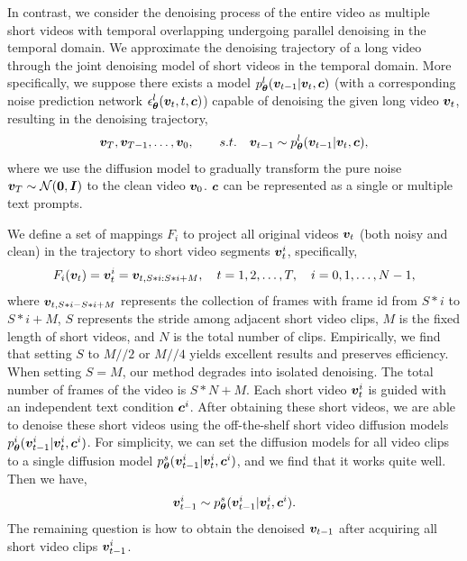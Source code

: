 \documentclass{article}
\begin{document}
In contrast, we consider the denoising process of the entire video as multiple short videos with temporal overlapping undergoing parallel denoising in the temporal domain. We approximate the denoising trajectory of a long video through the joint denoising model of short videos in the temporal domain. More specifically, we suppose there exists a model $p^l_{\bm{\theta}}({\bm{v}}_{t-1}|{\bm{v}}_{t},{\bm{c}})$ (with a corresponding noise prediction network $\epsilon_{{\bm{\theta}}}^l({\bm{v}}_t,t,{\bm{c}})$) capable of denoising the given long video ${\bm{v}}_t$, resulting in the denoising trajectory,
\begin{align*}
 {\bm{v}}_{T},{\bm{v}}_{T-1},\dots,{\bm{v}}_0, \qquad s.t. \quad {\bm{v}}_{t-1} \sim p^l_{\bm{\theta}}({\bm{v}}_{t-1}|{\bm{v}}_{t},{\bm{c}}),
\end{align*}
where we use the diffusion model to gradually transform the pure noise ${\bm{v}}_T\sim \mathcal N(\boldsymbol{0},{\bm{I}})$ to the clean video ${\bm{v}}_0$. ${\bm{c}}$ can be represented as a single or multiple text prompts.

We define a set of mappings $F_i$ to project all original videos ${\bm{v}}_t$ (both noisy and clean) in the trajectory to short video segments ${\bm{v}}_{t}^i$, specifically,
\begin{align*}
    F_i({\bm{v}}_t) = {\bm{v}}^i_{t} = {\bm{v}}_{t,S*i:S*i+M}, \quad t=1,2,\dots,T, \quad i=0,1,\dots,N-1,
\end{align*}
where ${\bm{v}}_{t,S*i-S*i+M}$ represents the collection of frames with frame id from $S*i$ to $S*i+M$, $S$ represents the stride among adjacent short video clips, $M$ is the fixed length of short videos, and $N$ is the total number of clips. Empirically, we find that setting $S$ to $M//2$ or $M//4$ yields excellent results and preserves efficiency. When setting $S=M$, our method degrades into isolated denoising. The total number of frames of the video is $S*N+M$. Each short video ${\bm{v}}_{t}^i$ is guided with an independent text condition ${\bm{c}}^i$. After obtaining these short videos, we are able to denoise these short videos using the off-the-shelf short video diffusion models $p_{\bm{\theta}}^i({\bm{v}}^i_{t-1}|{\bm{v}}^i_{t}, {\bm{c}}^i)$. For simplicity, we can set the diffusion models for all video clips to a single diffusion model $p_{\bm{\theta}}^s({\bm{v}}_{t-1}^i|{\bm{v}}_{t}^i,{\bm{c}}^i)$, and we find that it works quite well. Then we have,
\begin{align*}
    {\bm{v}}_{t-1}^i\sim p_{\bm{\theta}}^s({\bm{v}}_{t-1}^i| {\bm{v}}_{t}^i, {\bm{c}}^i).
\end{align*}
The remaining question is how to obtain the denoised ${\bm{v}}_{t-1}$ after acquiring all short video clips ${\bm{v}}_{t-1}^i$.
\end{document}
